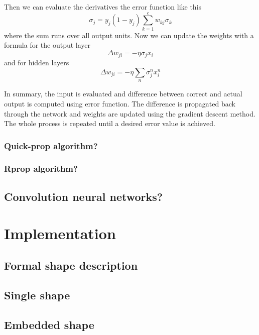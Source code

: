 Then we can evaluate the derivatives the error function like this
\begin{equation*}
\sigma_{j} = y_{j}(1-y_{j}) \sum_{k=1}^{c} w_{kj} \sigma_{k}
\end{equation*}
where the sum runs over all output units. Now we can update the weights with a formula for the output layer
\begin{equation*}
\Delta w_{ji} = - \eta \sigma_{j} x_{i}
\end{equation*}
and for hidden layers
\begin{equation*}
\Delta w_{ji} =  - \eta \sum_{n} \sigma_{j}^{n} x_{i}^{n}
\end{equation*}

In summary, the input is evaluated and difference between correct and actual output is computed using error function. The difference is propagated back through the network and weights are updated using the gradient descent method. The whole process is repeated until a desired error value is achieved.

\subsection{Quick-prop algorithm?}

\subsection{Rprop algorithm?}

\section{Convolution neural networks?}

\chapter{Implementation}

\section{Formal shape description}

\section{Single shape}

\section{Embedded shape}

